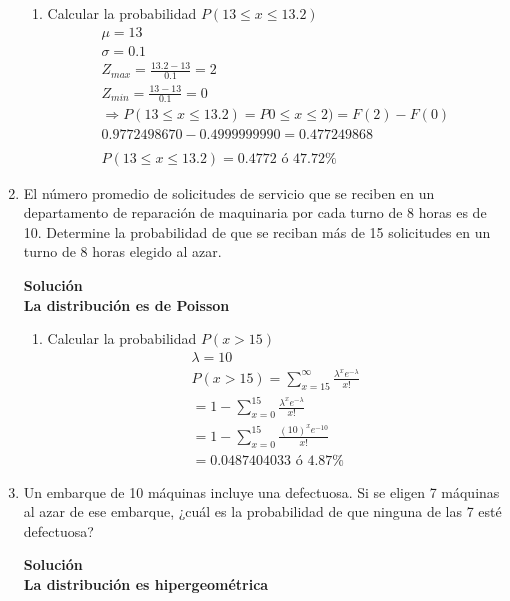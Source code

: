 \begin{enumerate}
\begin{enumerate}
        \item Calcular la probabilidad $P(13\leq x\leq 13.2)$ \\
        \begin{gather*}
        \mu = 13\\
        \sigma = 0.1\\
        Z_{max} = \frac{13.2-13}{0.1} = 2\\
        Z_{min} = \frac{13-13}{0.1} = 0\\
        \Rightarrow P(13\leq x\leq 13.2)=P0\leq x\leq 2) = F(2) - F(0)\\
        0.9772498670-0.4999999990 = 0.477249868\\\\
        P(13\leq x\leq 13.2) =  0.4772 \text{ ó } 47.72\%
        \end{gather*}
    \end{enumerate}
    
    \item El número promedio de solicitudes de servicio que se reciben en un departamento de reparación de maquinaria por cada turno de 8 horas es de 10. Determine la probabilidad de que se reciban más de 15 solicitudes en un turno de 8 horas elegido al azar.
    
    \textbf{Solución}\\
    \textbf{La distribución es de Poisson}
    \begin{enumerate}
        
        \item Calcular la probabilidad $P( x >15)$ \\
        \begin{gather*}
        \lambda = 10\\
        P( x >15) = \sum_{x=15}^{\infty}\frac{\lambda^{x}e^{-\lambda}}{x!}\\
        =1- \sum_{x=0}^{15}\frac{\lambda^{x}e^{-\lambda}}{x!}\\
        =1- \sum_{x=0}^{15}\frac{(10)^{x}e^{-10}}{x!}\\
        =0.0487404033 \text{ ó } 4.87\%
        \end{gather*}
    \end{enumerate}
    
    \item Un embarque de 10 máquinas incluye una defectuosa. Si se eligen 7 máquinas al azar de ese embarque, ¿cuál es la probabilidad de que ninguna de las 7 esté defectuosa?
    
    \textbf{Solución}\\
    \textbf{La distribución es hipergeométrica}
    \begin{enumerate}
        

\end{enumerate}
\end{enumerate}
